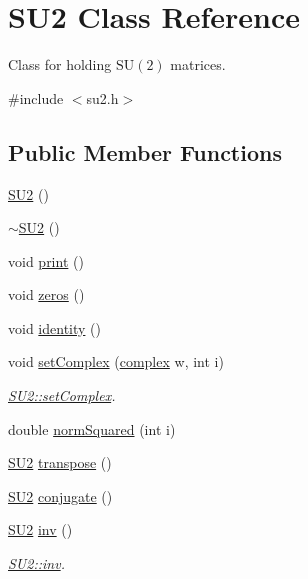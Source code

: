 \hypertarget{class_s_u2}{}\section{S\+U2 Class Reference}
\label{class_s_u2}


Class for holding $\mathrm{SU}(2)$ matrices.  




{\ttfamily \#include $<$su2.\+h$>$}

\subsection*{Public Member Functions}
\begin{DoxyCompactItemize}
\item 
\mbox{\hyperlink{class_s_u2_a681fd5c1304d6f160686d7e9c0842ecb}{S\+U2}} ()
\item 
\mbox{\hyperlink{class_s_u2_a966f54ae31784aba31580b4569d83e1f}{$\sim$\+S\+U2}} ()
\item 
void \mbox{\hyperlink{class_s_u2_a1210d531ef84574deb5f03dd24de80cf}{print}} ()
\item 
void \mbox{\hyperlink{class_s_u2_a348ca5d38346892060a05f7d9de02916}{zeros}} ()
\item 
void \mbox{\hyperlink{class_s_u2_a17ce46d1d9db179d045602b90b3d5af4}{identity}} ()
\item 
void \mbox{\hyperlink{class_s_u2_afe1d093aaf7325c1a7490f84e4c59b12}{set\+Complex}} (\mbox{\hyperlink{classcomplex}{complex}} w, int i)
\begin{DoxyCompactList}\small\item\em \mbox{\hyperlink{class_s_u2_afe1d093aaf7325c1a7490f84e4c59b12}{S\+U2\+::set\+Complex}}. \end{DoxyCompactList}\item 
double \mbox{\hyperlink{class_s_u2_ad1eebb9f268f569b888f1ae6ab6a7e6c}{norm\+Squared}} (int i)
\item 
\mbox{\hyperlink{class_s_u2}{S\+U2}} \mbox{\hyperlink{class_s_u2_a798389d4b2bc24cea6a466473004e3f8}{transpose}} ()
\item 
\mbox{\hyperlink{class_s_u2}{S\+U2}} \mbox{\hyperlink{class_s_u2_afb3a5fc8c00a45a0044113fb742727cc}{conjugate}} ()
\item 
\mbox{\hyperlink{class_s_u2}{S\+U2}} \mbox{\hyperlink{class_s_u2_a2f7f6ade28078418c8ee97234fff4dd0}{inv}} ()
\begin{DoxyCompactList}\small\item\em \mbox{\hyperlink{class_s_u2_a2f7f6ade28078418c8ee97234fff4dd0}{S\+U2\+::inv}}. \end{DoxyCompactList}\item 

\end{DoxyCompactItemize}
